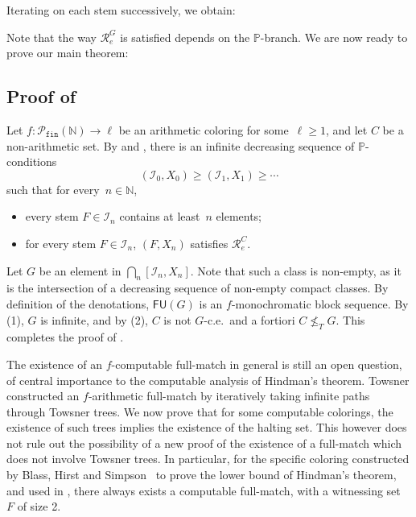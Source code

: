 \documentclass[10pt,a4paper]{article}
\def\PP{\mathbb{P}}
\def\I{\mathcal{I}}
\def\Rc{\mathcal{R}}
\newcommand{\NN}[0]{\mathbb{N}}
\newcommand{\Pfin}{\mathcal{P}_{\mathtt{fin}}}
\newcommand{\FU}[0]{\mathsf{FU}} %
\def\h#1{\hat{#1}}
\numberwithin{theorem}{section}
\newtheorem{lemma}[theorem]{Lemma}
\begin{document}
Iterating  on each stem successively, we obtain:


Note that the way $\Rc^G_e$ is satisfied depends on the $\PP$-branch.
We are now ready to prove our main theorem:

\subsection{Proof of }

Let $f : \Pfin(\NN) \to \ell$ be an arithmetic coloring for some~$\ell \geq 1$, and let $C$ be a non-arithmetic set.
By  and , there is an infinite decreasing sequence of $\PP$-conditions
$$
(\I_0, X_0) \geq (\I_1, X_1) \geq \cdots
$$
such that for every~$n \in \NN$,
\begin{itemize}
    \item[(1)] every stem $F \in \I_n$ contains at least~$n$ elements;
    \item[(2)] for every stem $F \in \I_n$, $(F, X_n)$ satisfies $\Rc^C_e$.
\end{itemize}
Let $G$ be an element in $\bigcap_n [\I_n, X_n]$. Note that such a class is non-empty, as it is the intersection of a decreasing sequence of non-empty compact classes. By definition of the denotations, $\FU(G)$ is an $f$-monochromatic block sequence. By (1), $G$ is infinite, and by (2), $C$ is not $G$-c.e.\ and a fortiori $C \not \leq_T G$. This completes the proof of .
\bigskip

The existence of an $f$-computable full-match in general is still an open question, of central importance to the computable analysis of Hindman's theorem. Towsner constructed an $f$-arithmetic full-match by iteratively taking infinite paths through Towsner trees. We now prove that for some computable colorings, the existence of such trees implies the existence of the halting set. This however does not rule out the possibility of a new proof of the existence of a full-match which does not involve Towsner trees. In particular, for the specific coloring constructed by Blass, Hirst and Simpson~\cite{blassLogicalAnalysisTheorems1987} to prove the lower bound of Hindman's theorem, and used in , there always exists a computable full-match, with a witnessing set~$F$ of size 2.
\end{document}
